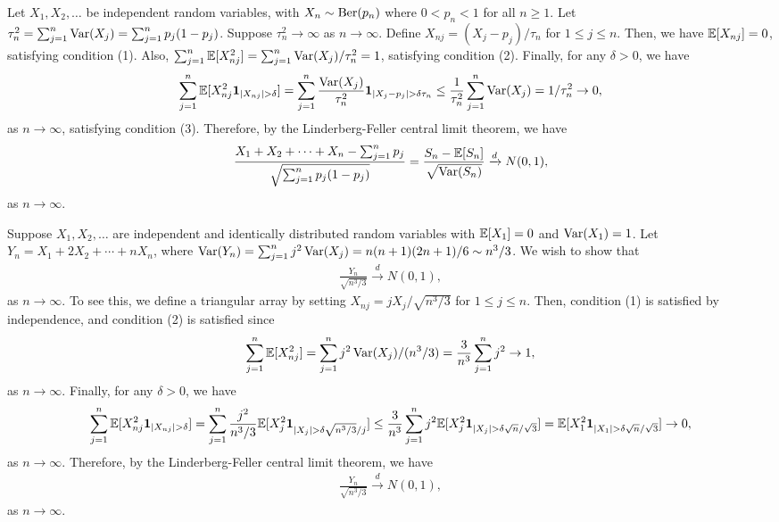 \begin{example}
    Let $X_{1},X_{2},\ldots$ be independent random variables, with $X_{n} \sim \operatorname{Ber}(p_{n})$ where $0 < p_{n} < 1$ for all $n \geq 1$. Let $\tau_{n}^{2} = \sum_{j=1}^{n} \operatorname{Var}(X_{j}) = \sum_{j=1}^{n} p_{j}(1-p_{j})$. Suppose $\tau_{n}^{2} \to \infty$ as $n \to \infty$. Define $X_{nj} = (X_{j}-p_{j})/\tau_{n}$ for $1 \leq j \leq n$. Then, we have $\mathbb{E}[X_{nj}] = 0$, satisfying condition (1). Also, $\sum_{j=1}^{n} \mathbb{E}[X_{nj}^{2}] = \sum_{j=1}^{n} \operatorname{Var}(X_{j})/\tau_{n}^{2} = 1$, satisfying condition (2). Finally, for any $\delta > 0$, we have
    \begin{align}
        \sum_{j=1}^{n} \mathbb{E}[X_{nj}^{2}\textbf{1}_{\left| X_{nj} \right| > \delta}] = \sum_{j=1}^{n} \frac{\operatorname{Var}(X_{j})}{\tau_{n}^{2}} \textbf{1}_{\left| X_{j}-p_{j} \right| > \delta\tau_{n}} \leq \frac{1}{\tau_{n}^{2}} \sum_{j=1}^{n} \operatorname{Var}(X_{j}) = 1/\tau_{n}^{2} \to 0,
    \end{align}
    as $n \to \infty$, satisfying condition (3). Therefore, by the Linderberg-Feller central limit theorem, we have
    \begin{align}
        \frac{X_{1}+X_{2}+\cdots+X_{n}-\sum_{j=1}^{n}p_{j}}{\sqrt{\sum_{j=1}^{n}p_{j}(1-p_{j})}} = \frac{S_{n}-\mathbb{E}[S_{n}]}{\sqrt{\operatorname{Var}(S_{n})}} \xrightarrow{d} N(0,1),
    \end{align}
    as $n \to \infty$.
\end{example}
\begin{example}
    Suppose $X_{1},X_{2},\ldots$ are independent and identically distributed random variables with $\mathbb{E}[X_{1}] = 0$ and $\operatorname{Var}(X_{1}) = 1$. Let $Y_{n} = X_{1}+2X_{2}+\cdots+nX_{n}$, where $\operatorname{Var}(Y_{n}) = \sum_{j=1}^{n} j^{2} \operatorname{Var}(X_{j}) = n(n+1)(2n+1)/6 \sim n^{3}/3$. We wish to show that
    \begin{align}
        \frac{Y_{n}}{\sqrt{n^{3}/3}} \xrightarrow{d} N(0,1),
    \end{align}
    as $n \to \infty$. To see this, we define a triangular array by setting $X_{nj} = jX_{j}/\sqrt{n^{3}/3}$ for $1 \leq j \leq n$. Then, condition (1) is satisfied by independence, and condition (2) is satisfied since
    \begin{align}
        \sum_{j=1}^{n} \mathbb{E}[X_{nj}^{2}] = \sum_{j=1}^{n} j^{2}\operatorname{Var}(X_{j})/(n^{3}/3) = \frac{3}{n^{3}}\sum_{j=1}^{n} j^{2} \to 1,
    \end{align}
    as $n \to \infty$. Finally, for any $\delta > 0$, we have
    \begin{align}
        \sum_{j=1}^{n} \mathbb{E}[X_{nj}^{2}\textbf{1}_{\left| X_{nj} \right| > \delta}] = \sum_{j=1}^{n} \frac{j^{2}}{n^{3}/3} \mathbb{E}[X_{j}^{2}\textbf{1}_{\left| X_{j} \right| > \delta\sqrt{n^{3}/3}/j}] \leq \frac{3}{n^{3}}\sum_{j=1}^{n} j^{2} \mathbb{E}[X_{j}^{2}\textbf{1}_{\left| X_{j} \right| > \delta\sqrt{n}/\sqrt{3}}] = \mathbb{E}[X_{1}^{2}\textbf{1}_{\left| X_{1} \right| > \delta\sqrt{n}/\sqrt{3}}] \to 0,
    \end{align}
    as $n \to \infty$. Therefore, by the Linderberg-Feller central limit theorem, we have
    \begin{align}
        \frac{Y_{n}}{\sqrt{n^{3}/3}} \xrightarrow{d} N(0,1),
    \end{align}
    as $n \to \infty$.
\end{example}

